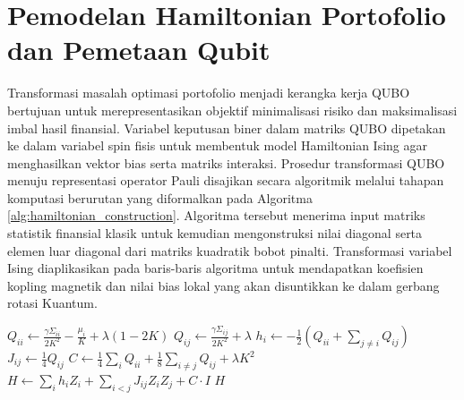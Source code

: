 \section{Pemodelan Hamiltonian Portofolio dan Pemetaan Qubit}
Transformasi masalah optimasi portofolio menjadi kerangka kerja QUBO bertujuan untuk merepresentasikan objektif minimalisasi risiko dan maksimalisasi imbal hasil finansial. Variabel keputusan biner dalam matriks QUBO dipetakan ke dalam variabel spin fisis untuk membentuk model Hamiltonian Ising agar menghasilkan vektor bias serta matriks interaksi. Prosedur transformasi QUBO menuju representasi operator Pauli disajikan secara algoritmik melalui tahapan komputasi berurutan yang diformalkan pada Algoritma \ref{alg:hamiltonian_construction}. Algoritma tersebut menerima input matriks statistik finansial klasik untuk kemudian mengonstruksi nilai diagonal serta elemen luar diagonal dari matriks kuadratik bobot pinalti. Transformasi variabel Ising diaplikasikan pada baris-baris algoritma untuk mendapatkan koefisien kopling magnetik dan nilai bias lokal yang akan disuntikkan ke dalam gerbang rotasi Kuantum.

\begin{algorithm}[ht]
\caption{Konstruksi Hamiltonian Portofolio Ising}
\label{alg:hamiltonian_construction}
\begin{algorithmic}[1]
    \State $Q_{ii} \gets \frac{\gamma \Sigma_{ii}}{2K^2} - \frac{\mu_i}{K} + \lambda(1 - 2K)$ 
    \State $Q_{ij} \gets \frac{\gamma \Sigma_{ij}}{2K^2} + \lambda$ 
    \State $h_i \gets -\frac{1}{2} (Q_{ii} + \sum_{j \neq i} Q_{ij})$ 
    \State $J_{ij} \gets \frac{1}{4} Q_{ij}$ 
    \State $C \gets \frac{1}{4} \sum_{i} Q_{ii} + \frac{1}{8} \sum_{i \neq j} Q_{ij} + \lambda K^2$ 
    \State $H \gets \sum_{i} h_i Z_i + \sum_{i < j} J_{ij} Z_i Z_j + C \cdot I$ 
    \State \Return $H$
\EndProcedure
\end{algorithmic}
\end{algorithm}
